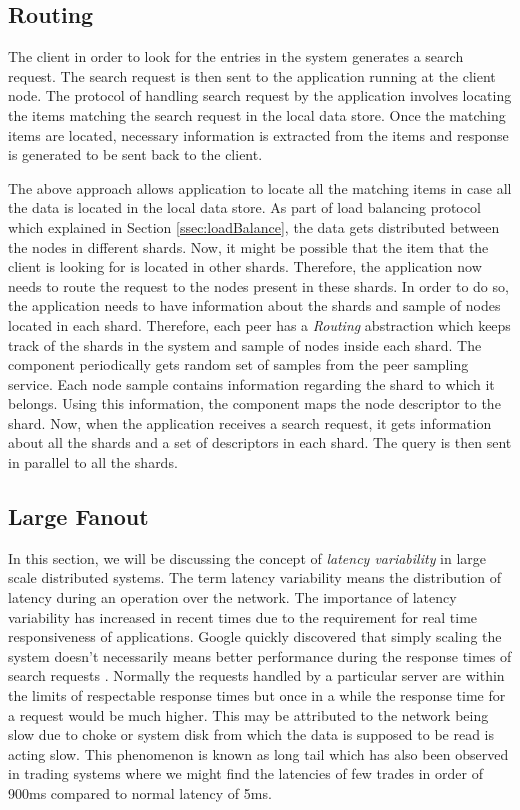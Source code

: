 \documentclass[12pt,a4paper,twoside,openright]{book}
\begin{document}
\subsection{Routing}
\label{ssec:routing}

\par The client in order to look for the entries in the system generates a search request. The search request is then sent to the application running at the client node. The protocol of handling search request by the application involves locating the items matching the search request in the local data store. Once the matching items are located, necessary information is extracted from the items and response is generated to be sent back to the client. 

\par The above approach allows application to locate all the matching items in case all the data is located in the local data store. As part of load balancing protocol which explained in Section \ref{ssec:loadBalance}, the data gets distributed between the nodes in different shards. Now, it might be possible that the item that the client is looking for is located in other shards. Therefore, the application now needs to route the request to the nodes present in these shards. In order to do so, the application needs to have information about the shards and sample of nodes located in each shard. Therefore, each peer has a \textit{Routing} abstraction which keeps track of the shards in the system and sample of nodes inside each shard. The component periodically gets random set of samples from the peer sampling service. Each node sample contains information regarding the shard to which it belongs. Using this information, the component maps the node descriptor to the shard. Now, when the application receives a search request, it gets information about all the shards and a set of descriptors in each shard. The query is then sent in parallel to all the shards. 


\subsection{Large Fanout}

In this section, we will be discussing the concept of \textit{latency variability} in large scale distributed systems. The term latency variability means the distribution of latency during an operation over the network. The importance of latency variability has increased in recent times due to the requirement for real time responsiveness of applications. Google quickly discovered that simply scaling the system doesn't necessarily means better performance during the response times of search requests \cite{tamingTail}. Normally the requests handled by a particular server are within the limits of respectable response times but once in a while the response time for a request would be much higher. This may be attributed to the network being slow due to choke or system disk from which the data is supposed to be read is acting slow. This phenomenon is known as long tail which has also been observed in trading systems where we might find the latencies of few trades in order of 900ms compared to normal latency of 5ms. 
\end{document}
